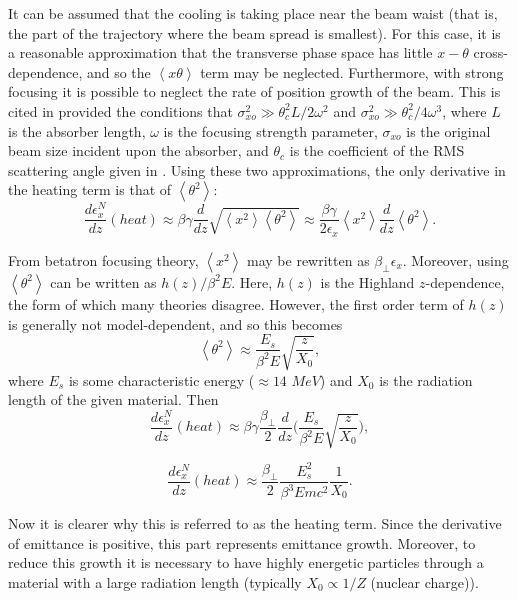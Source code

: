 It can be assumed that the cooling is taking place near the beam waist (that is, the part of the trajectory where the beam spread is smallest). For this case, it is a reasonable approximation that the transverse phase space has little $x-\theta$ cross-dependence, and so the $\left<x\theta\right>$ term may be neglected. Furthermore, with strong focusing it is possible to neglect the rate of position growth of the beam. This is cited in \cite{Fernow} provided the conditions that $\sigma_{xo}^2 \gg \theta_c^2 L / 2\omega^2$ and $\sigma_{xo}^2 \gg \theta_c^2 / 4\omega^3$, where $L$ is the absorber length, $\omega$ is the focusing strength parameter, $\sigma_{xo}$ is the original beam size incident upon the absorber, and $\theta_c$ is the coefficient of the RMS scattering angle given in \cite{highland}. Using these two approximations, the only derivative in the heating term is that of $\left<\theta^2\right>$:
\begin{equation} \nonumber
\frac{d\epsilon_x^N}{dz}(heat)\approx\beta\gamma\frac{d}{dz}\sqrt{\left<x^2\right>\left<\theta^2\right>}\approx \frac{\beta\gamma}{2\epsilon_x}\left<x^2\right>\frac{d}{dz}\left<\theta^2\right>.
\end{equation}

From betatron focusing theory, $\left<x^2\right>$ may be rewritten as $\beta_\perp \epsilon_x$. Moreover, using \cite{highland} $\left<\theta^2\right>$ can be written as $h(z)/\beta^2E$. Here, $h(z)$ is the Highland $z$-dependence, the form of which many theories disagree. However, the first order term of $h(z)$ is generally not model-dependent, and so this becomes
\begin{equation} \nonumber
\left<\theta^2\right>\approx\frac{E_s}{\beta^2 E}\sqrt{\frac{z}{X_0}},
\end{equation}
where $E_s$ is some characteristic energy ($\approx14$ $MeV$) and $X_0$ is the radiation length of the given material. Then
\begin{equation} \nonumber
\frac{d\epsilon_x^N}{dz}(heat)\approx\beta\gamma\frac{\beta_\perp}{2}\frac{d}{dz}\big(\frac{E_s}{\beta^2 E}\sqrt{\frac{z}{X_0}}\big),
\end{equation}

\begin{equation}
\label{eqn:emittanceheat}
\frac{d\epsilon_x^N}{dz}(heat)\approx\frac{\beta_\perp}{2}\frac{E_s^2}{\beta^3Emc^2}\frac{1}{X_0}.
\end{equation}

Now it is clearer why this is referred to as the heating term. Since the derivative of emittance is positive, this part represents emittance growth. Moreover, to reduce this growth it is necessary to have highly energetic particles through a material with a large radiation length (typically $X_0 \propto 1/Z$ (nuclear charge)).

